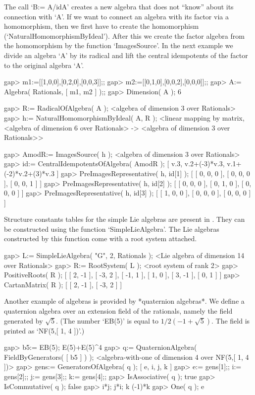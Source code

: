 The call `B:= A/idA' creates a new algebra that does not ``know'' about
its connection with `A'. If we want to connect an algebra with its factor
via a homomorphism, then we first have to create the homomorphism
(`NaturalHomomorphismByIdeal'). After this we create the factor algebra 
from the homomorphism by the function `ImagesSource'. In the next example
we divide an algebra `A' by its radical and lift the central idempotents
of the factor to the original algebra `A'.

\beginexample
gap> m1:=[[1,0,0],[0,2,0],[0,0,3]];;
gap> m2:=[[0,1,0],[0,0,2],[0,0,0]];;
gap> A:= Algebra( Rationals, [ m1, m2 ] );;
gap> Dimension( A );
6
\endexample

\beginexample
gap> R:= RadicalOfAlgebra( A );
<algebra of dimension 3 over Rationals>
gap> h:= NaturalHomomorphismByIdeal( A, R );
<linear mapping by matrix, <algebra of dimension 
6 over Rationals> -> <algebra of dimension 3 over Rationals>>
\endexample

\beginexample
gap> AmodR:= ImagesSource( h );
<algebra of dimension 3 over Rationals>
gap> id:= CentralIdempotentsOfAlgebra( AmodR );
[ v.3, v.2+(-3)*v.3, v.1+(-2)*v.2+(3)*v.3 ]
gap> PreImagesRepresentative( h, id[1] );
[ [ 0, 0, 0 ], [ 0, 0, 0 ], [ 0, 0, 1 ] ]
gap> PreImagesRepresentative( h, id[2] );
[ [ 0, 0, 0 ], [ 0, 1, 0 ], [ 0, 0, 0 ] ]
gap> PreImagesRepresentative( h, id[3] );
[ [ 1, 0, 0 ], [ 0, 0, 0 ], [ 0, 0, 0 ] ]
\endexample

Structure constants tables for the simple Lie algebras are present in {\GAP}.
They can be constructed using the function `SimpleLieAlgebra'. The Lie 
algebras constructed by this function come with a root system attached.

\beginexample
gap> L:= SimpleLieAlgebra( "G", 2, Rationals );
<Lie algebra of dimension 14 over Rationals>
gap> R:= RootSystem( L );
<root system of rank 2>
gap> PositiveRoots( R );
[ [ 2, -1 ], [ -3, 2 ], [ -1, 1 ], [ 1, 0 ], [ 3, -1 ], [ 0, 1 ] ]
gap> CartanMatrix( R );
[ [ 2, -1 ], [ -3, 2 ] ]
\endexample

Another example of algebras is provided by *quaternion algebras*.
We define a quaternion algebra over an extension field of the
rationals, namely the field generated by $\sqrt{5}$.
(The number `EB(5)' is equal to $1/2 (-1+\sqrt{5})$.
The field is printed as `NF(5,[ 1, 4 ])'.)

\beginexample
gap> b5:= EB(5);
E(5)+E(5)^4
gap> q:= QuaternionAlgebra( FieldByGenerators( [ b5 ] ) );
<algebra-with-one of dimension 4 over NF(5,[ 1, 4 ])>
gap> gens:= GeneratorsOfAlgebra( q );
[ e, i, j, k ]
gap> e:= gens[1];; i:= gens[2];; j:= gens[3];; k:= gens[4];;
gap> IsAssociative( q );
true
gap> IsCommutative( q );
false
gap> i*j; j*i;
k
(-1)*k
gap> One( q );
e
\endexample


